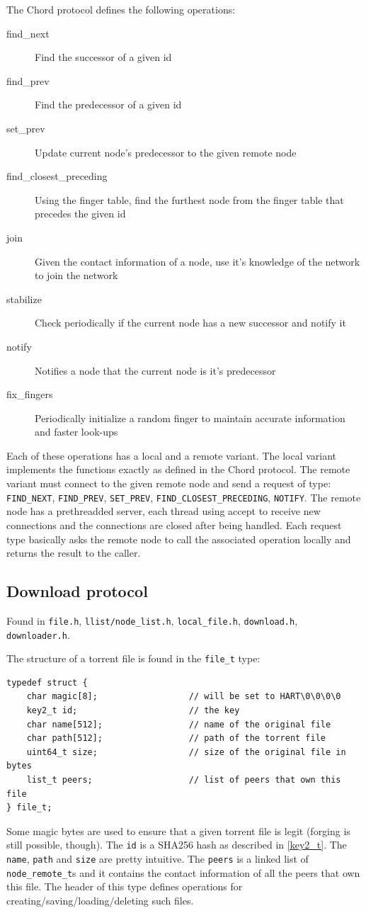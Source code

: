\documentclass[runningheads]{llncs}
\begin{document}
The Chord protocol defines the following operations:
\begin{description}
    \item[find\_next] Find the successor of a given id
    \item[find\_prev] Find the predecessor of a given id
    \item[set\_prev] Update current node's predecessor to the given remote node
    \item[find\_closest\_preceding] Using the finger table, find the furthest node from the finger table that precedes the given id
    \item[join] Given the contact information of a node, use it's knowledge of the network to join the network
    \item[stabilize] Check periodically if the current node has a new successor and notify it
    \item[notify] Notifies a node that the current node is it's predecessor
    \item[fix\_fingers] Periodically initialize a random finger to maintain accurate information and faster look-ups
\end{description}

Each of these operations has a local and a remote variant. The local variant implements the functions exactly as defined in the Chord protocol. The remote variant must connect to the given remote node and send a request of type: \verb|FIND_NEXT|, \verb|FIND_PREV|, \verb|SET_PREV|, \verb|FIND_CLOSEST_PRECEDING|, \verb|NOTIFY|. The remote node has a prethreadded server, each thread using accept to receive new connections and the connections are closed after being handled. Each request type basically asks the remote node to call the associated operation locally and returns the result to the caller.

\subsection{Download protocol}
Found in \verb|file.h|, \verb|llist/node_list.h|, \verb|local_file.h|, \verb|download.h|, \verb|downloader.h|.

The structure of a torrent file is found in the \verb|file_t| type:
\begin{lstlisting}
typedef struct {
    char magic[8];                  // will be set to HART\0\0\0\0
    key2_t id;                      // the key
    char name[512];                 // name of the original file
    char path[512];                 // path of the torrent file
    uint64_t size;                  // size of the original file in bytes
    list_t peers;                   // list of peers that own this file
} file_t;
\end{lstlisting}
Some magic bytes are used to ensure that a given torrent file is legit (forging is still possible, though). The \verb|id| is a SHA256 hash as described in \ref{key2_t}. The \verb|name|, \verb|path| and \verb|size| are pretty intuitive. The \verb|peers| is a linked list of \verb|node_remote_t|s and it contains the contact information of all the peers that own this file. The header of this type defines operations for creating/saving/loading/deleting such files.
\end{document}
